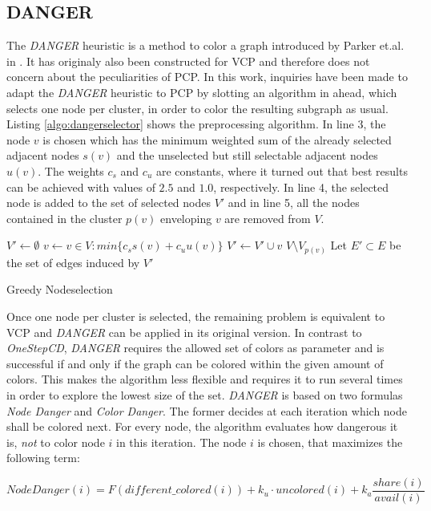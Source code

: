 \subsection{DANGER}
The \textit{DANGER} heuristic is a method to color a graph introduced by Parker et.al. in \cite{glover-96}. It has originaly also been constructed for VCP and therefore does not concern about the peculiarities of PCP. In this work, inquiries have been made to adapt the \textit{DANGER} heuristic to PCP by slotting an algorithm in ahead, which selects one node per cluster, in order to color the resulting subgraph as usual.\\ 
Listing \ref{algo:dangerselector} shows the preprocessing algorithm. In line 3, the node $v$ is chosen which has the minimum weighted sum of the already selected adjacent nodes $s(v)$ and the unselected but still selectable adjacent nodes $u(v)$. The weights $c_s$ and $c_u$ are constants, where it turned out that best results can be achieved with values of $2.5$ and $1.0$, respectively. In line 4, the selected node is added to the set of selected nodes $V'$ and in line 5, all the nodes contained in the cluster $p(v)$ enveloping $v$ are removed from $V$. 

\begin{algorithm}[h]
$V' \gets \emptyset$\;
 {
        $v \gets v\in V : min\{ c_s s(v) + c_u u(v) \}$\;
        $V' \gets V' \cup v$\;
        $V \setminus V_{p(v)}$\;
}
Let $E'\subset E$ be the set of edges induced by $V'$\;
\caption{Greedy Nodeselection}
\label{algo:dangerselector}
\end{algorithm}


Once one node per cluster is selected, the remaining problem is equivalent to VCP and \textit{DANGER} can be applied in its original version. In contrast to \textit{OneStepCD}, \textit{DANGER} requires the allowed set of colors as parameter and is successful if and only if the graph can be colored within the given amount of colors. This makes the algorithm less flexible and requires it to run several times in order to explore the lowest size of the set. \textit{DANGER} is based on two formulas \textit{Node Danger} and \textit{Color Danger}.
The former decides at each iteration which node shall be colored next. For every node, the algorithm evaluates how dangerous it is, \textit{not} to color node $i$ in this iteration. The node $i$ is chosen, that maximizes the following term:

$$ \mathit{NodeDanger}(i) =  F(\mathit{different\_colored}(i)) + k_u \cdot \mathit{uncolored}(i) + k_a \frac{\mathit{share}(i)}{\mathit{avail}(i)} $$

